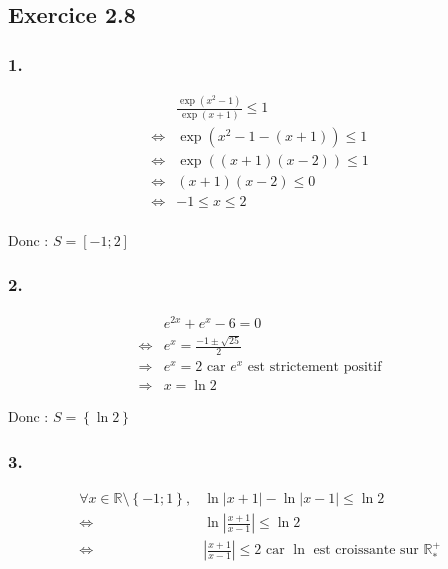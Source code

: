 \documentclass{report}
\begin{document}
\subsection*{Exercice 2.8}

\subsubsection*{1.}
\begin{equation*}
	\begin{split}
		&\frac{\exp(x^2-1)}{\exp(x+1)} \leq 1 \\
		\Longleftrightarrow &\exp(x^2-1 -(x+1)) \leq 1 \\
		\Longleftrightarrow &\exp((x+1)(x-2)) \leq 1 \\
		\Longleftrightarrow &(x+1)(x-2) \leq 0 \\
		\Longleftrightarrow & -1 \leq x \leq 2 \\
	\end{split}
\end{equation*}

Donc : $S= [-1 ; 2]$

\subsubsection*{2.}
\begin{equation*}
	\begin{split}
		& e^{2x} + e^x -6 = 0 \\
		\Longleftrightarrow & e^x = \frac{-1\pm \sqrt{25}}{2} \\
		\Longrightarrow & e^x = 2 \text{ car $e^x$ est strictement positif} \\
		\Longrightarrow & x = \ln 2
	\end{split}
\end{equation*}

Donc : $S=\left\lbrace \ln 2 \right\rbrace$

\subsubsection*{3.}
\begin{equation*}
	\begin{split}
		\forall x \in \mathbb{R} \setminus \left\lbrace -1 ; 1 \right\rbrace, & \ln |x+1| - \ln |x-1| \leq \ln 2 \\
		\Longleftrightarrow & \ln \left| \frac{x+1}{x-1} \right| \leq \ln 2 \\
		\Longleftrightarrow & \left| \frac{x+1}{x-1} \right| \leq 2 \text{ car $\ln$ est croissante sur $\mathbb{R}^{+}_{*}$} \\
	\end{split}
\end{equation*}
\end{document}
